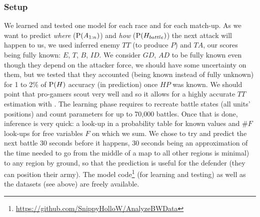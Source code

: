 \subsubsection{Setup}
We learned and tested one model for each race and for each match-up. As we want to predict \textit{where} ($\mathrm{P}(A_{1:n})$) and \textit{how} ($\mathrm{P}(H_{battle})$) the next attack will happen to us, we used inferred enemy $TT$ (to produce $P$) and $TA$, our scores being fully known: $E$, $T$, $B$, $ID$. We consider $GD$, $AD$ to be fully known even though they depend on the attacker force, we should have some uncertainty on them, but we tested that they accounted (being known instead of fully unknown) for 1 to 2\% of $\mathrm{P}(H)$ accuracy (in prediction) once $HP$ was known. We should point that pro-gamers scout very well and so it allows for a highly accurate $TT$ estimation with \citep{SYNNAEVE:StratPred}. The learning phase requires to recreate battle states (all units' positions) and count parameters for up to 70,000 battles. Once that is done, inference is very quick: a look-up in a probability table for known values and $\#F$ look-ups for free variables $F$ on which we sum. We chose to try and predict the next battle 30 seconds before it happens, 30 seconds being an approximation of the time needed to go from the middle of a map %
to all other regions is minimal) to any region by ground, so that the prediction is useful for the defender (they can position their army). The model code\footnote{\url{https://github.com/SnippyHolloW/AnalyzeBWData}} (for learning and testing) as well as the datasets (see above) are freely available. 


